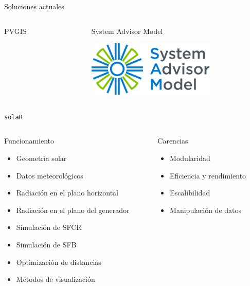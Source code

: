 \documentclass[aspectratio=169, usenames,svgnames,dvipsnames]{beamer}
\begin{document}
\begin{frame}[label={sec:orga19cf2d}]{Soluciones actuales}
\begin{columns}
\begin{column}{0.2\columnwidth}
\begin{block}{\alert{PVGIS}}
\begin{center}
\end{center}
\end{block}
\end{column}
\begin{column}{0.2\columnwidth}
\begin{block}{\alert{System Advisor Model}}
\begin{center}
\includegraphics[width=\textwidth]{../figuras/SAM-logo-horizontal.png}
\end{center}
\end{block}
\end{column}
\end{columns}
\end{frame}
\begin{frame}[label={sec:org349cc5b},fragile]{\texttt{solaR}}
 \begin{columns}
\begin{column}{0.45\columnwidth}
\begin{block}{Funcionamiento}
\begin{itemize}
\item Geometría solar
\item Datos meteorológicos
\item Radiación en el plano horizontal
\item Radiación en el plano del generador
\item Simulación de SFCR
\item Simulación de SFB
\item Optimización de distancias
\item Métodos de visualización
\end{itemize}
\end{block}
\end{column}
\begin{column}{0.45\columnwidth}
\begin{block}{Carencias}
\begin{itemize}
\item Modularidad
\item Eficiencia y rendimiento
\item Escalibilidad
\item Manipulación de datos
\end{itemize}
\end{block}
\end{column}
\end{columns}
\end{frame}
\end{document}
